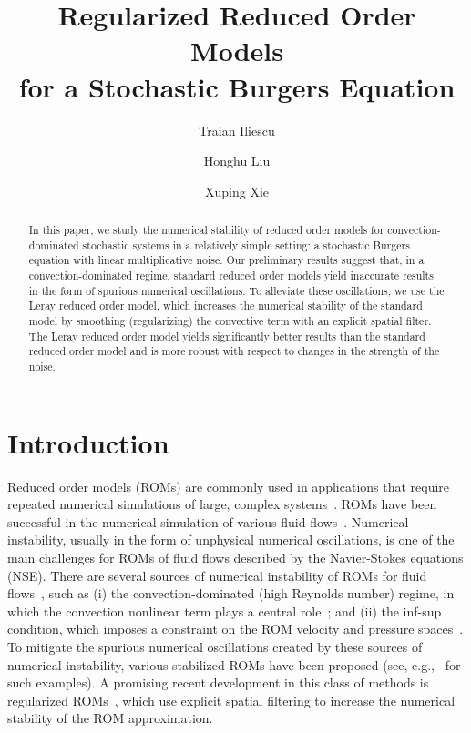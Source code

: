 \documentclass[11pt]{amsart}
\title[Regularized Reduced Order Models for a Stochastic Burgers Equation]{Regularized Reduced Order Models \\ for a Stochastic Burgers Equation}
\author[Traian Iliescu]{Traian Iliescu}
\author[Honghu Liu]{Honghu Liu}
\author[Xuping Xie]{Xuping Xie}
\numberwithin{equation}{section}
\begin{document}
\begin{abstract}
 
 In this paper, we study the numerical stability of reduced order models for convection-dominated stochastic systems in a relatively simple setting: a stochastic Burgers equation with linear multiplicative noise.
Our preliminary results suggest that, in a convection-dominated regime, standard reduced order models yield inaccurate results in the form of spurious numerical oscillations.
To alleviate these oscillations, we use the Leray reduced order model, which increases the numerical stability of the standard model by smoothing (regularizing) the convective term with an explicit spatial filter.
The Leray reduced order model yields significantly better results than the standard reduced order model and is more robust with respect to changes in the strength of the noise.

\end{abstract}

\maketitle



\section{Introduction}
\label{sec:introduction}

Reduced order models (ROMs) are commonly used in applications that require repeated numerical simulations of large, complex systems~\cite{hesthaven2015certified,quarteroni2015reduced}.
ROMs have been successful in the numerical simulation of various fluid flows~\cite{HLB96,noack2011reduced}.
Numerical instability, usually in the form of unphysical numerical oscillations, is one of the main challenges for ROMs of fluid flows described by the Navier-Stokes equations (NSE).
There are several sources of numerical instability of ROMs for fluid flows~\cite{caiazzo2013numerical}, such as (i) the convection-dominated (high Reynolds number) regime, in which the convection nonlinear term plays a central role~\cite{AHLS88,HLB96,noack2011reduced}; and (ii) the inf-sup condition, which imposes a constraint on the ROM velocity and pressure spaces~\cite{ballarin2015supremizer,caiazzo2013numerical}.
To mitigate the spurious numerical oscillations created by these sources of numerical instability, various stabilized ROMs have been proposed (see, e.g.,~\cite{amsallem2012stabilization,AHLS88,balajewicz2013low,ballarin2015supremizer,barone2009stable,bergmann2009enablers,carlberg2013gnat,cordier2010calibration,giere2015supg,kalashnikova2010stability,pacciarini2014stabilized,quarteroni2011certified,wang2012proper,xiao2014non} for such examples).
A promising recent development in this class of methods is regularized ROMs~\cite{sabetghadam2012alpha,wells2016regularized}, which use explicit spatial filtering to increase the numerical stability of the ROM approximation.
\end{document}
